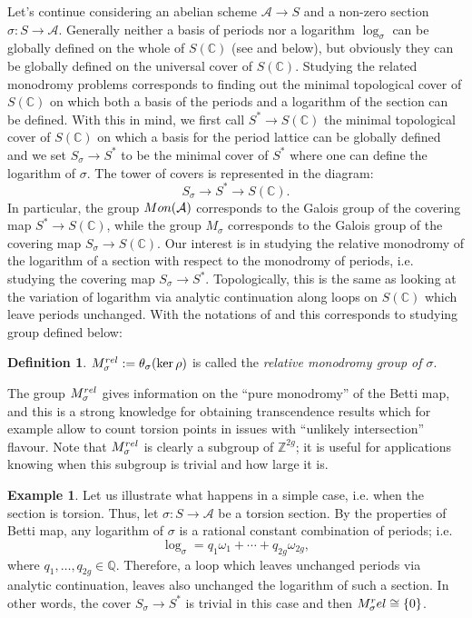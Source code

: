 \documentclass[10 pt,a4paper]{article}
\theoremstyle{plain}
\theoremstyle{definition}
\newtheorem{defn}[thm]{Definition}
\newtheorem{expl}[thm]{Example}
\theoremstyle{named}
\newcommand{\cA}{\mathcal A}
\newcommand{\bC}{\mathbb C}
\newcommand{\bQ}{\mathbb Q}
\newcommand{\bZ}{\mathbb Z}
\begin{document}
Let's continue considering an abelian scheme $\cA \rightarrow S$ and a non-zero section $\sigma:S \rightarrow \cA$. Generally neither a basis of periods nor a logarithm $\log_\sigma$ can be globally defined on the whole of $S(\bC)$ (see  and  below), but obviously they can be globally defined on the universal cover of $S(\bC)$. Studying the related monodromy problems corresponds to finding out the minimal topological cover of $S(\bC)$ on which both a basis of the periods and a logarithm of the section can be defined. With this in mind, we first call $S^* \rightarrow S(\bC)$ the minimal topological cover of $S(\bC)$ on which a basis for the period lattice can be globally defined and we set $S_\sigma \rightarrow S^*$ to be the minimal cover of $S^*$ where one can define the logarithm of $\sigma$. The tower of covers is represented in the diagram:
\begin{equation}\label{monodromyDiagram}
	S_\sigma \rightarrow S^* \rightarrow S(\bC).
\end{equation}
In particular, the group $\textnormal{Mon}(\cA)$ corresponds to the Galois group of the covering map $S^* \rightarrow S(\bC)$, while the group $M_\sigma$ corresponds to the Galois group of the covering map $S_\sigma\rightarrow S(\bC)$. Our interest is in studying the relative monodromy of the logarithm of a section with respect to the monodromy of periods, i.e. studying the covering map $S_\sigma \rightarrow S^*$. Topologically, this is the same as looking at the variation of logarithm via analytic continuation along loops on $S(\bC)$ which leave periods unchanged. With the notations of  and  this corresponds to studying group defined below:

\begin{defn}
$M_\sigma^{\textnormal{rel}}:=\theta_\sigma(\ker{\rho})$ is called the \emph{relative monodromy group of $\sigma$}.
\end{defn}
The group $M_\sigma^{\textnormal{rel}}$ gives information on the ``pure monodromy'' of the Betti map, and this is a strong knowledge for obtaining transcendence results which for example allow to count torsion points in issues with ``unlikely intersection'' flavour. Note that $M_\sigma^{\textnormal{rel}}$ is clearly a subgroup of $\bZ^{2g}$; it is useful for applications knowing when this subgroup is trivial and how large it is.

\begin{expl}\label{exaTorsSec}
	Let us illustrate what happens in a simple case, i.e. when the section is torsion. Thus, let $\sigma:S \rightarrow \cA$ be a torsion section. By the properties of Betti map, any logarithm of $\sigma$ is a rational constant combination of periods; i.e.
	$$
	\log_\sigma = q_1 \omega_1 + \cdots + q_{2g} \omega_{2g},
	$$
	where $q_1, \ldots, q_{2g} \in \bQ$. Therefore, a loop which leaves unchanged periods via analytic continuation, leaves also unchanged the logarithm of such a section. In other words, the cover $S_\sigma \rightarrow S^*$ is trivial in this case and then $M_\sigma^\textnormal{rel}\cong \{0\}$.
\end{expl}
\end{document}
